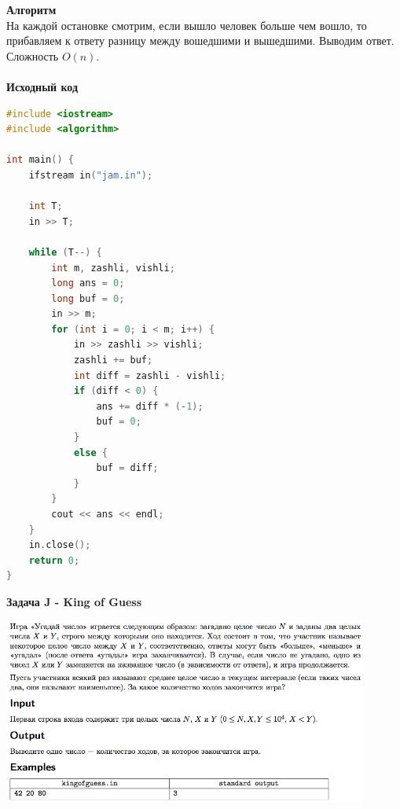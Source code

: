 \documentclass[a4paper,12pt]{article}
\begin{document}
\textbf{{\large Алгоритм}} \\
На каждой остановке смотрим, если вышло человек больше чем вошло, то прибавляем к ответу разницу между вошедшими и вышедшими. Выводим ответ. Сложность $O(n)$.\\ 
\\
\textbf{{\large Исходный код}}
\begin{lstlisting}[language=C++]
#include <iostream>
#include <algorithm>

int main() {
    ifstream in("jam.in");

    int T;
    in >> T;

    while (T--) {
        int m, zashli, vishli;
        long ans = 0;
        long buf = 0;
        in >> m;
        for (int i = 0; i < m; i++) {
            in >> zashli >> vishli;
            zashli += buf;
            int diff = zashli - vishli;
            if (diff < 0) {
                ans += diff * (-1);
                buf = 0;
            }
            else {
                buf = diff;
            }
        }
        cout << ans << endl;
    }
    in.close();
    return 0;
}
\end{lstlisting}
\newpage
\textbf{{\large Задача J - King of Guess}} \\
\begin{center}
\includegraphics[width=0.9\textwidth]{OC_Karelia/OC_Karelia_J.png}\\ [1cm]
\end{center}
\newpage
\end{document}
